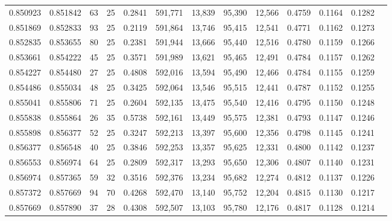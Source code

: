 \begin{tabular}{rrrrrrrrrrrrr}
0.850923 & 0.851842 &    63 &  25 &                                     0.2841 & 591,771 &  13,839 &  95,390 &  12,566 & 0.4759 & 0.1164 & 0.1282 \\
0.851869 & 0.852833 &    93 &  25 &                                     0.2119 & 591,864 &  13,746 &  95,415 &  12,541 & 0.4771 & 0.1162 & 0.1273 \\
0.852835 & 0.853655 &    80 &  25 &                                     0.2381 & 591,944 &  13,666 &  95,440 &  12,516 & 0.4780 & 0.1159 & 0.1266 \\
0.853661 & 0.854222 &    45 &  25 &                                     0.3571 & 591,989 &  13,621 &  95,465 &  12,491 & 0.4784 & 0.1157 & 0.1262 \\
0.854227 & 0.854480 &    27 &  25 &                                     0.4808 & 592,016 &  13,594 &  95,490 &  12,466 & 0.4784 & 0.1155 & 0.1259 \\
0.854486 & 0.855034 &    48 &  25 &                                     0.3425 & 592,064 &  13,546 &  95,515 &  12,441 & 0.4787 & 0.1152 & 0.1255 \\
0.855041 & 0.855806 &    71 &  25 &                                     0.2604 & 592,135 &  13,475 &  95,540 &  12,416 & 0.4795 & 0.1150 & 0.1248 \\
0.855838 & 0.855864 &    26 &  35 &                                     0.5738 & 592,161 &  13,449 &  95,575 &  12,381 & 0.4793 & 0.1147 & 0.1246 \\
0.855898 & 0.856377 &    52 &  25 &                                     0.3247 & 592,213 &  13,397 &  95,600 &  12,356 & 0.4798 & 0.1145 & 0.1241 \\
0.856377 & 0.856548 &    40 &  25 &                                     0.3846 & 592,253 &  13,357 &  95,625 &  12,331 & 0.4800 & 0.1142 & 0.1237 \\
0.856553 & 0.856974 &    64 &  25 &                                     0.2809 & 592,317 &  13,293 &  95,650 &  12,306 & 0.4807 & 0.1140 & 0.1231 \\
0.856974 & 0.857365 &    59 &  32 &                                     0.3516 & 592,376 &  13,234 &  95,682 &  12,274 & 0.4812 & 0.1137 & 0.1226 \\
0.857372 & 0.857669 &    94 &  70 &                                     0.4268 & 592,470 &  13,140 &  95,752 &  12,204 & 0.4815 & 0.1130 & 0.1217 \\
0.857669 & 0.857890 &    37 &  28 &                                     0.4308 & 592,507 &  13,103 &  95,780 &  12,176 & 0.4817 & 0.1128 & 0.1214 \\

\end{tabular}
